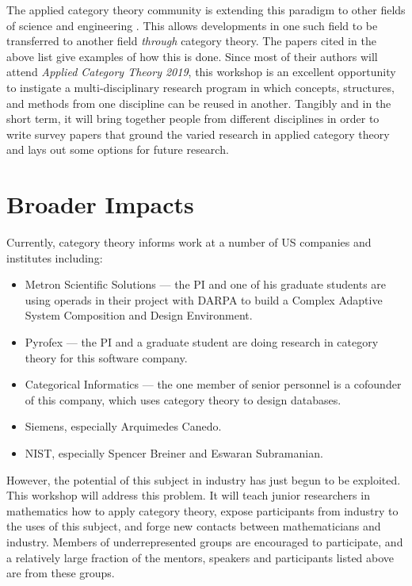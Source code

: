 \documentclass[12pt]{amsart}
\begin{document}
The applied category theory community is extending this paradigm to other fields of science and engineering \cite{spivak14}.  This allows developments in one such field to be transferred to another field \emph{through} category theory.  The papers cited in the above list give examples of how this is done.  Since most of their authors will attend \textsl{Applied Category Theory 2019}, this workshop is an excellent opportunity to instigate a multi-disciplinary research program in which concepts, structures, and methods from one discipline can be reused in another. Tangibly and in the short term, it will bring together people from different disciplines in order to write survey papers that ground the varied research in applied category theory and lays out some options for future research.


\section{Broader Impacts}
 
Currently, category theory informs work at a number of US companies and institutes including:

\begin{itemize}
\item Metron Scientific Solutions --- the PI and one of his graduate
  students are using operads in their project with DARPA to build a
  Complex Adaptive System Composition and Design Environment.
\item Pyrofex --- the PI and a graduate student are doing research in
  category theory for this software company.
\item Categorical Informatics --- the one member of senior personnel
  is a cofounder of this company, which uses category theory to design
  databases.
\item Siemens, especially Arquimedes Canedo.
\item NIST, especially Spencer Breiner and Eswaran Subramanian.
\end{itemize}   

However, the potential of this subject in industry has just begun to
be exploited.  This workshop will address this problem.  It will teach
junior researchers in mathematics how to apply category theory, expose
participants from industry to the uses of this subject, and forge new
contacts between mathematicians and industry.  Members of
underrepresented groups are encouraged to participate, and a
relatively large fraction of the mentors, speakers and participants
listed above are from these groups.
\end{document}
